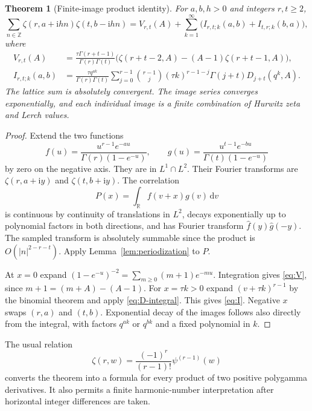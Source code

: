 \documentclass[11pt,a4paper]{article}
\numberwithin{equation}{section}
\newtheorem{theorem}{Theorem}[section]
\theoremstyle{definition}
\theoremstyle{remark}
\newcommand{\dd}{\,\mathrm d}
\newcommand{\ii}{\mathrm i}
\newcommand{\Z}{\mathbb Z}
\begin{document}
\begin{theorem}[Finite-image product identity]\label{thm:bilinear}
For $a,b,h>0$ and integers $r,t\ge2$,
\begin{equation}\label{eq:bilinear-main}
 \sum_{n\in\Z}\zeta(r,a+\ii hn)\zeta(t,b-\ii hn)
       =V_{r,t}(A)+\sum_{k=1}^\infty
             \bigl(I_{r,t;k}(a,b)+I_{t,r;k}(b,a)\bigr),
\end{equation}
where
\begin{align}
 V_{r,t}(A)
  &=\frac{\tau\Gamma(r+t-1)}{\Gamma(r)\Gamma(t)}
       \bigl(\zeta(r+t-2,A)-(A-1)\zeta(r+t-1,A)\bigr),
       \label{eq:V}\\
 I_{r,t;k}(a,b)
  &=\frac{\tau q^{ak}}{\Gamma(r)\Gamma(t)}
       \sum_{j=0}^{r-1}\binom{r-1}{j}(\tau k)^{r-1-j}
                      \Gamma(j+t)D_{j+t}(q^k,A).
       \label{eq:I}
\end{align}
The lattice sum is absolutely convergent. The image series converges
exponentially, and each individual image is a finite combination of
Hurwitz zeta and Lerch values.
\end{theorem}
\begin{proof}
Extend the two functions
\[
 f(u)=\frac{u^{r-1}e^{-au}}{\Gamma(r)(1-e^{-u})},\qquad
 g(u)=\frac{u^{t-1}e^{-bu}}{\Gamma(t)(1-e^{-u})}
\]
by zero on the negative axis. They are in $L^1\cap L^2$.
Their Fourier transforms are $\zeta(r,a+\ii y)$ and
$\zeta(t,b+\ii y)$. The correlation
\[
 P(x)=\int_{\mathbb R}f(v+x)g(v)\dd v
\]
is continuous by continuity of translations in $L^2$, decays
exponentially up to polynomial factors in both directions, and has
Fourier transform
$\widehat f(y)\widehat g(-y)$. The sampled transform is absolutely
summable since the product is $O(|n|^{2-r-t})$.
Apply Lemma~\ref{lem:periodization} to $P$.

At $x=0$ expand $(1-e^{-u})^{-2}=\sum_{m\ge0}(m+1)e^{-mu}$.
Integration gives \eqref{eq:V}, since
$m+1=(m+A)-(A-1)$. For $x=\tau k>0$ expand
$(v+\tau k)^{r-1}$ by the binomial theorem and apply
\eqref{eq:D-integral}. This gives \eqref{eq:I}. Negative $x$
swaps $(r,a)$ and $(t,b)$. Exponential decay of the images follows
also directly from the integral, with factors $q^{ak}$ or $q^{bk}$
and a fixed polynomial in $k$.
\end{proof}

The usual relation
\begin{equation}\label{eq:polygamma}
 \zeta(r,w)=\frac{(-1)^r}{(r-1)!}\psi^{(r-1)}(w)
\end{equation}
converts the theorem into a formula for every product of two positive
polygamma derivatives. It also permits a finite harmonic-number
interpretation after horizontal integer differences are taken.
\end{document}

